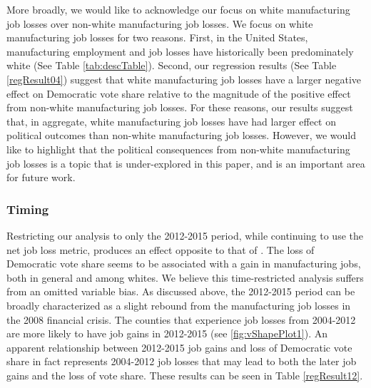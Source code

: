 \documentclass[]{AEA}
\begin{document}
More broadly, we would like to acknowledge our focus on white
manufacturing job losses over non-white manufacturing job losses. We
focus on white manufacturing job losses for two reasons. First, in the
United States, manufacturing employment and job losses have historically
been predominately white (See Table \ref{tab:descTable}). Second, our
regression results (See Table \ref{regResult04}) suggest that white
manufacturing job losses have a larger negative effect on Democratic
vote share relative to the magnitude of the positive effect from
non-white manufacturing job losses. For these reasons, our results
suggest that, in aggregate, white manufacturing job losses have had
larger effect on political outcomes than non-white manufacturing job
losses. However, we would like to highlight that the political
consequences from non-white manufacturing job losses is a topic that is
under-explored in this paper, and is an important area for future work.

\subsubsection{Timing}

Restricting our analysis to only the 2012-2015 period, while continuing
to use the net job loss metric, produces an effect opposite to that of
\cite{Baccini21}. The loss of Democratic vote share seems to be
associated with a gain in manufacturing jobs, both in general and among
whites. We believe this time-restricted analysis suffers from an omitted
variable bias. As discussed above, the 2012-2015 period can be broadly
characterized as a slight rebound from the manufacturing job losses in
the 2008 financial crisis. The counties that experience job losses from
2004-2012 are more likely to have job gains in 2012-2015 (see
\ref{fig:vShapePlot1}). An apparent relationship between 2012-2015 job
gains and loss of Democratic vote share in fact represents 2004-2012 job
losses that may lead to both the later job gains and the loss of vote
share. These results can be seen in Table \ref{regResult12}.
\FloatBarrier
\end{document}
